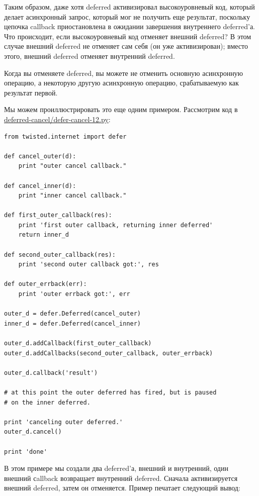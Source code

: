 Таким образом, даже хотя deferred активизировал 
высокоуровневый код, который делает асинхронный запрос, 
который мог не получить еще результат, поскольку цепочка 
callback приостановлена в ожидании завершения внутреннего 
deferred'а. Что происходит, если высокоуровневый код 
отменяет внешний deferred? В этом случае внешний deferred 
не отменяет сам себя (он уже активизирован); вместо этого, 
внешний deferred отменяет внутренний deferred.


Когда вы отменяете deferred, вы можете не отменить 
основную асинхронную операцию, а некоторую другую асинхронную 
операцию, срабатываемую как результат первой.

Мы можем проиллюстрировать это еще одним примером. 
Рассмотрим код в 
\href{http://github.com/jdavisp3/twisted-intro/blob/master/deferred-cancel/defer-cancel-12.py#L1}{deferred-cancel/defer-cancel-12.py}:

\begin{scriptsize}\begin{verbatim}
from twisted.internet import defer

def cancel_outer(d):
    print "outer cancel callback."

def cancel_inner(d):
    print "inner cancel callback."

def first_outer_callback(res):
    print 'first outer callback, returning inner deferred'
    return inner_d

def second_outer_callback(res):
    print 'second outer callback got:', res

def outer_errback(err):
    print 'outer errback got:', err

outer_d = defer.Deferred(cancel_outer)
inner_d = defer.Deferred(cancel_inner)

outer_d.addCallback(first_outer_callback)
outer_d.addCallbacks(second_outer_callback, outer_errback)

outer_d.callback('result')

# at this point the outer deferred has fired, but is paused
# on the inner deferred.

print 'canceling outer deferred.'
outer_d.cancel()

print 'done'
\end{verbatim}\end{scriptsize}

В этом примере мы создали два deferred'а, внешний и внутренний, 
один внешний сallback возвращает внутренний deferred. Сначала активизируется 
внешний deferred, затем он отменяется. Пример печатает следующий вывод:

